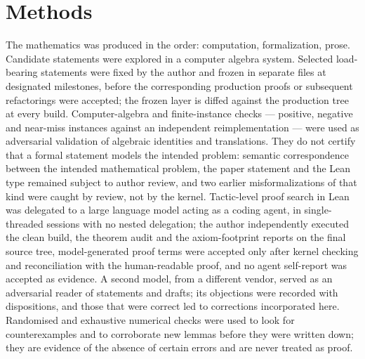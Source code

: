 \section*{Methods}
The mathematics was produced in the order: computation, formalization, prose. Candidate statements were explored in a computer algebra system. Selected load-bearing statements were fixed by the author and frozen in separate files at designated milestones, before the corresponding production proofs or subsequent refactorings were accepted; the frozen layer is diffed against the production tree at every build. Computer-algebra and finite-instance checks — positive, negative and near-miss instances against an independent reimplementation — were used as adversarial validation of algebraic identities and translations. They do not certify that a formal statement models the intended problem: semantic correspondence between the intended mathematical problem, the paper statement and the Lean type remained subject to author review, and two earlier misformalizations of that kind were caught by review, not by the kernel. Tactic-level proof search in Lean was delegated to a large language model acting as a coding agent, in single-threaded sessions with no nested delegation; the author independently executed the clean build, the theorem audit and the axiom-footprint reports on the final source tree, model-generated proof terms were accepted only after kernel checking and reconciliation with the human-readable proof, and no agent self-report was accepted as evidence. A second model, from a different vendor, served as an adversarial reader of statements and drafts; its objections were recorded with dispositions, and those that were correct led to corrections incorporated here. Randomised and exhaustive numerical checks were used to look for counterexamples and to corroborate new lemmas before they were written down; they are evidence of the absence of certain errors and are never treated as proof.

